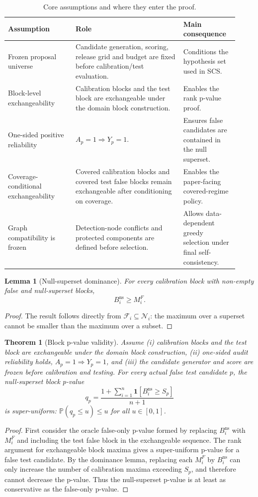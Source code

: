 \documentclass[11pt]{article}
\newtheorem{lemma}{Lemma}
\newtheorem{theorem}{Theorem}
\newcommand{\Ncal}{\mathcal N}
\newcommand{\Fcal}{\mathcal F}
\newcommand{\Prob}{\mathbb P}
\newcommand{\ind}{\mathbf 1}
\begin{document}
\begin{table}[h]
\centering
\caption{Core assumptions and where they enter the proof.}
\small
\begin{tabular}{p{0.27\linewidth}p{0.43\linewidth}p{0.22\linewidth}}
\toprule
Assumption & Role & Main consequence \\
\midrule
Frozen proposal universe & Candidate generation, scoring, release grid and budget are fixed before calibration/test evaluation. & Conditions the hypothesis set used in SCS. \\
Block-level exchangeability & Calibration blocks and the test block are exchangeable under the domain block construction. & Enables the rank p-value proof. \\
One-sided positive reliability & \(A_p=1\Rightarrow Y_p=1\). & Ensures false candidates are contained in the null superset. \\
Coverage-conditional exchangeability & Covered calibration blocks and covered test false blocks remain exchangeable after conditioning on coverage. & Enables the paper-facing covered-regime policy. \\
Graph compatibility is frozen & Detection-node conflicts and protected components are defined before selection. & Allows data-dependent greedy selection under final self-consistency. \\
\bottomrule
\end{tabular}
\end{table}

\begin{lemma}[Null-superset dominance]
For every calibration block with non-empty false and null-superset blocks,
\[
B_i^{\mathrm{ns}}\ge M_i^F .
\]
\end{lemma}
\begin{proof}
The result follows directly from \(\Fcal_i\subseteq\Ncal_i\): the maximum over a superset cannot be smaller than the maximum over a subset.
\end{proof}

\begin{theorem}[Block p-value validity]
Assume (i) calibration blocks and the test block are exchangeable under the domain block construction, (ii) one-sided audit reliability holds, \(A_p=1\Rightarrow Y_p=1\), and (iii) the candidate generator and score are frozen before calibration and testing.
For every actual false test candidate \(p\), the null-superset block p-value
\[
q_p=
\frac{1+\sum_{i=1}^{n}\ind[B_i^{\mathrm{ns}}\ge S_p]}{n+1}
\]
is super-uniform: \(\Prob(q_p\le u)\le u\) for all \(u\in[0,1]\).
\end{theorem}
\begin{proof}
First consider the oracle false-only p-value formed by replacing \(B_i^{\mathrm{ns}}\) with \(M_i^F\) and including the test false block in the exchangeable sequence.
The rank argument for exchangeable block maxima gives a super-uniform p-value for a false test candidate.
By the dominance lemma, replacing each \(M_i^F\) by \(B_i^{\mathrm{ns}}\) can only increase the number of calibration maxima exceeding \(S_p\), and therefore cannot decrease the p-value.
Thus the null-superset p-value is at least as conservative as the false-only p-value.
\end{proof}
\end{document}
